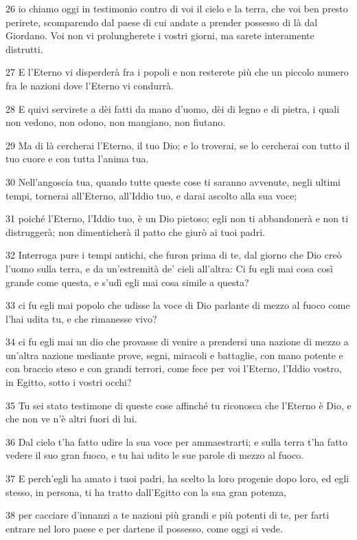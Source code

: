 \par 26 io chiamo oggi in testimonio contro di voi il cielo e la terra, che voi ben presto perirete, scomparendo dal paese di cui andate a prender possesso di là dal Giordano. Voi non vi prolungherete i vostri giorni, ma sarete interamente distrutti.
\par 27 E l'Eterno vi disperderà fra i popoli e non resterete più che un piccolo numero fra le nazioni dove l'Eterno vi condurrà.
\par 28 E quivi servirete a dèi fatti da mano d'uomo, dèi di legno e di pietra, i quali non vedono, non odono, non mangiano, non fiutano.
\par 29 Ma di là cercherai l'Eterno, il tuo Dio; e lo troverai, se lo cercherai con tutto il tuo cuore e con tutta l'anima tua.
\par 30 Nell'angoscia tua, quando tutte queste cose ti saranno avvenute, negli ultimi tempi, tornerai all'Eterno, all'Iddio tuo, e darai ascolto alla sua voce;
\par 31 poiché l'Eterno, l'Iddio tuo, è un Dio pietoso; egli non ti abbandonerà e non ti distruggerà; non dimenticherà il patto che giurò ai tuoi padri.
\par 32 Interroga pure i tempi antichi, che furon prima di te, dal giorno che Dio creò l'uomo sulla terra, e da un'estremità de' cieli all'altra: Ci fu egli mai cosa così grande come questa, e s'udì egli mai cosa simile a questa?
\par 33 ci fu egli mai popolo che udisse la voce di Dio parlante di mezzo al fuoco come l'hai udita tu, e che rimanesse vivo?
\par 34 ci fu egli mai un dio che provasse di venire a prendersi una nazione di mezzo a un'altra nazione mediante prove, segni, miracoli e battaglie, con mano potente e con braccio steso e con grandi terrori, come fece per voi l'Eterno, l'Iddio vostro, in Egitto, sotto i vostri occhi?
\par 35 Tu sei stato testimone di queste cose affinché tu riconosca che l'Eterno è Dio, e che non ve n'è altri fuori di lui.
\par 36 Dal cielo t'ha fatto udire la sua voce per ammaestrarti; e sulla terra t'ha fatto vedere il suo gran fuoco, e tu hai udito le sue parole di mezzo al fuoco.
\par 37 E perch'egli ha amato i tuoi padri, ha scelto la loro progenie dopo loro, ed egli stesso, in persona, ti ha tratto dall'Egitto con la sua gran potenza,
\par 38 per cacciare d'innanzi a te nazioni più grandi e più potenti di te, per farti entrare nel loro paese e per dartene il possesso, come oggi si vede.
